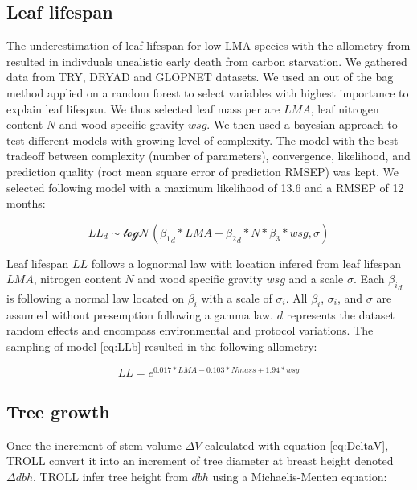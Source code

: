 \documentclass[]{article}
\theoremstyle{definition}
\theoremstyle{definition}
\theoremstyle{remark}
\begin{document}
\subsection{Leaf lifespan}\label{leaf-lifespan}

The underestimation of leaf lifespan for low LMA species with the
allometry from \citet{Reich1991a} resulted in indivduals unealistic
early death from carbon starvation. We gathered data from
TRY\citep{Kattge2011}, DRYAD \citep{chave_towards_2009} and GLOPNET
\citep{wright_worldwide_2004} datasets. We used an out of the bag method
applied on a random forest to select variables with highest importance
to explain leaf lifespan. We thus selected leaf mass per are \(LMA\),
leaf nitrogen content \(N\) and wood specific gravity \(wsg\). We then
used a bayesian approach to test different models with growing level of
complexity. The model with the best tradeoff between complexity (number
of parameters), convergence, likelihood, and prediction quality (root
mean square error of prediction RMSEP) was kept. We selected following
model with a maximum likelihood of 13.6 and a RMSEP of 12 months:

\begin{equation}
  LL_{d} \sim \mathcal{logN}({\beta_1}_d*LMA - {\beta_2}_d*N*\beta_3*wsg, \sigma)
  \label{eq:LLb}
\end{equation}

Leaf lifespan \(LL\) follows a lognormal law with location infered from
leaf lifespan \(LMA\), nitrogen content \(N\) and wood specific gravity
\(wsg\) and a scale \(\sigma\). Each \({\beta_i}_d\) is following a
normal law located on \(\beta_i\) with a scale of \(\sigma_i\). All
\(\beta_i\), \(\sigma_i\), and \(\sigma\) are assumed without
presemption following a gamma law. \(d\) represents the dataset random
effects and encompass environmental and protocol variations. The
sampling of model \eqref{eq:LLb} resulted in the following allometry:

\begin{equation}
  LL = e^{0.017*LMA - 0.103*Nmass + 1.94*wsg}
  \label{eq:LL}
\end{equation}

\subsection{Tree growth}\label{tree-growth}

Once the increment of stem volume \(\Delta V\) calculated with equation
\eqref{eq:DeltaV}, TROLL convert it into an increment of tree diameter at
breast height denoted \(\Delta dbh\). TROLL infer tree height from
\(dbh\) using a Michaelis-Menten equation:
\end{document}
